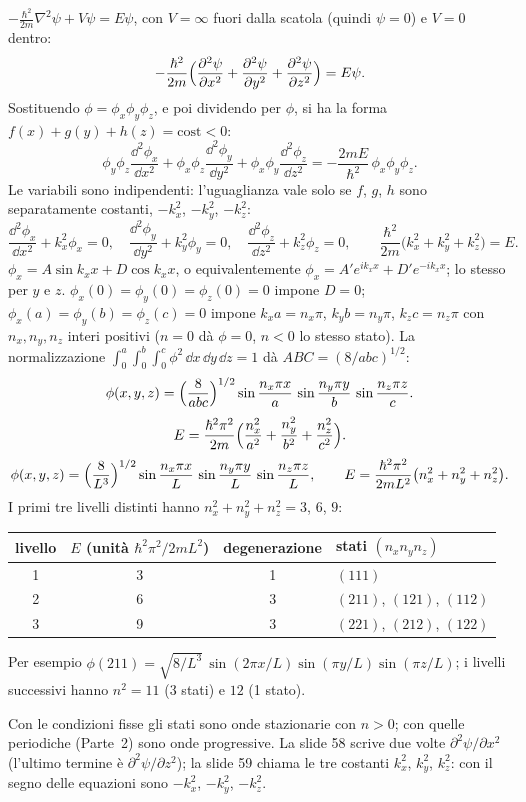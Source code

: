 \documentclass[11pt,a4paper]{article}
\begin{document}
\begin{esempio}[soluzione]
$-\frac{\hbar^2}{2m}\nabla^2\psi+V\psi=E\psi$, con $V=\infty$ fuori dalla scatola (quindi $\psi=0$) e $V=0$ dentro:
\[
-\frac{\hbar^2}{2m}\Bigl(\frac{\partial^2\psi}{\partial x^2}+\frac{\partial^2\psi}{\partial y^2}+\frac{\partial^2\psi}{\partial z^2}\Bigr)=E\psi .
\]
Sostituendo $\phi=\phi_x\phi_y\phi_z$, e poi dividendo per $\phi$, si ha la forma $f(x)+g(y)+h(z)=\text{cost}<0$:
\[
\phi_y\phi_z\frac{\dd^2\phi_x}{\dd x^2}+\phi_x\phi_z\frac{\dd^2\phi_y}{\dd y^2}+\phi_x\phi_y\frac{\dd^2\phi_z}{\dd z^2}=-\frac{2mE}{\hbar^2}\,\phi_x\phi_y\phi_z .
\]
Le variabili sono indipendenti: l'uguaglianza vale solo se $f$, $g$, $h$ sono separatamente costanti, $-k_x^2$, $-k_y^2$, $-k_z^2$:
\[
\frac{\dd^2\phi_x}{\dd x^2}+k_x^2\phi_x=0,\quad\frac{\dd^2\phi_y}{\dd y^2}+k_y^2\phi_y=0,\quad\frac{\dd^2\phi_z}{\dd z^2}+k_z^2\phi_z=0,\qquad
\frac{\hbar^2}{2m}\bigl(k_x^2+k_y^2+k_z^2\bigr)=E .
\]
$\phi_x=A\sin k_xx+D\cos k_xx$, o equivalentemente $\phi_x=A'e^{ik_xx}+D'e^{-ik_xx}$; lo stesso per $y$ e $z$.
$\phi_x(0)=\phi_y(0)=\phi_z(0)=0$ impone $D=0$; $\phi_x(a)=\phi_y(b)=\phi_z(c)=0$ impone $k_xa=n_x\pi$, $k_yb=n_y\pi$, $k_zc=n_z\pi$ con $n_x,n_y,n_z$
interi positivi ($n=0$ dà $\phi=0$, $n<0$ lo stesso stato). La normalizzazione $\int_0^a\!\int_0^b\!\int_0^c\phi^2\,\dd x\,\dd y\,\dd z=1$ dà
$ABC=(8/abc)^{1/2}$:
\[
\phi(x,y,z)=\Bigl(\frac8{abc}\Bigr)^{1/2}\sin\frac{n_x\pi x}a\,\sin\frac{n_y\pi y}b\,\sin\frac{n_z\pi z}c .
\]
\[
E=\frac{\hbar^2\pi^2}{2m}\Bigl(\frac{n_x^2}{a^2}+\frac{n_y^2}{b^2}+\frac{n_z^2}{c^2}\Bigr).
\]
\[
\phi(x,y,z)=\Bigl(\frac8{L^3}\Bigr)^{1/2}\sin\frac{n_x\pi x}L\,\sin\frac{n_y\pi y}L\,\sin\frac{n_z\pi z}L,\qquad
E=\frac{\hbar^2\pi^2}{2mL^2}\bigl(n_x^2+n_y^2+n_z^2\bigr).
\]
I primi tre livelli distinti hanno $n_x^2+n_y^2+n_z^2=3$, $6$, $9$:
\begin{center}\small
\begin{tabular}{@{}cccl@{}}
\toprule
livello & $E$ (unità $\hbar^2\pi^2/2mL^2$) & degenerazione & stati $(n_xn_yn_z)$\\
\midrule
1 & 3 & 1 & $(111)$\\
2 & 6 & 3 & $(211)$, $(121)$, $(112)$\\
3 & 9 & 3 & $(221)$, $(212)$, $(122)$\\
\bottomrule
\end{tabular}
\end{center}
Per esempio $\phi(211)=\sqrt{8/L^3}\,\sin(2\pi x/L)\sin(\pi y/L)\sin(\pi z/L)$; i livelli successivi hanno $n^2=11$ (3 stati) e $12$ (1 stato).
\end{esempio}
Con le condizioni fisse gli stati sono onde stazionarie con $n>0$; con quelle periodiche (Parte~2) sono onde progressive. La slide 58 scrive due
volte $\partial^2\psi/\partial x^2$ (l'ultimo termine è $\partial^2\psi/\partial z^2$); la slide 59 chiama le tre costanti $k_x^2$, $k_y^2$, $k_z^2$: con
il segno delle equazioni sono $-k_x^2$, $-k_y^2$, $-k_z^2$.
\end{document}

